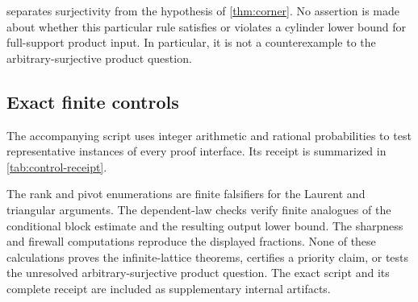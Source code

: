 \begin{remark}\label{rem:surjective-boundary}
 separates surjectivity from the hypothesis of
\cref{thm:corner}.  No assertion is made about whether this particular rule
satisfies or violates a cylinder lower bound for full-support product input.
In particular, it is not a counterexample to the arbitrary-surjective
product question.
\end{remark}

\subsection{Exact finite controls}

The accompanying script uses integer arithmetic and rational probabilities
to test representative instances of every proof interface.  Its receipt is
summarized in \cref{tab:control-receipt}.



The rank and pivot enumerations are finite falsifiers for the Laurent and
triangular arguments.  The dependent-law checks verify finite analogues of
the conditional block estimate and the resulting output lower bound.  The
sharpness and firewall computations reproduce the displayed fractions.
None of these calculations proves the infinite-lattice theorems, certifies a
priority claim, or tests the unresolved arbitrary-surjective product
question.  The exact script and its complete receipt are included as
supplementary internal artifacts.

